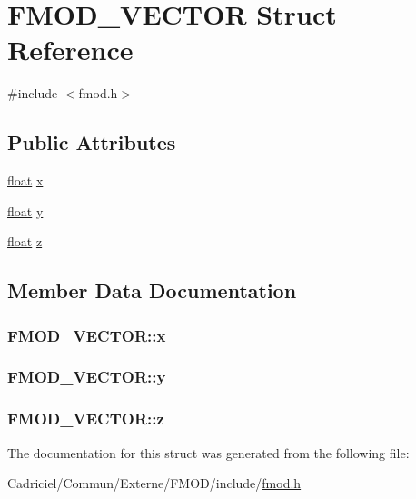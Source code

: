\hypertarget{struct_f_m_o_d___v_e_c_t_o_r}{\section{F\-M\-O\-D\-\_\-\-V\-E\-C\-T\-O\-R Struct Reference}
\label{struct_f_m_o_d___v_e_c_t_o_r}
}


{\ttfamily \#include $<$fmod.\-h$>$}

\subsection*{Public Attributes}
\begin{DoxyCompactItemize}
\item 
\hyperlink{fmod_8h_aeb841aa4b4b5f444b5d739d865b420af}{float} \hyperlink{struct_f_m_o_d___v_e_c_t_o_r_afe9fad8ce812c3cfc021c25bbb8bc0e8}{x}
\item 
\hyperlink{fmod_8h_aeb841aa4b4b5f444b5d739d865b420af}{float} \hyperlink{struct_f_m_o_d___v_e_c_t_o_r_abea7feb26ece298baa766f821b8686ff}{y}
\item 
\hyperlink{fmod_8h_aeb841aa4b4b5f444b5d739d865b420af}{float} \hyperlink{struct_f_m_o_d___v_e_c_t_o_r_ab64088b1bd2e695bd1abc6b370b71796}{z}
\end{DoxyCompactItemize}


\subsection{Member Data Documentation}
\hypertarget{struct_f_m_o_d___v_e_c_t_o_r_afe9fad8ce812c3cfc021c25bbb8bc0e8}{
\subsubsection[{x}]{ F\-M\-O\-D\-\_\-\-V\-E\-C\-T\-O\-R\-::x}}\label{struct_f_m_o_d___v_e_c_t_o_r_afe9fad8ce812c3cfc021c25bbb8bc0e8}
\hypertarget{struct_f_m_o_d___v_e_c_t_o_r_abea7feb26ece298baa766f821b8686ff}{
\subsubsection[{y}]{ F\-M\-O\-D\-\_\-\-V\-E\-C\-T\-O\-R\-::y}}\label{struct_f_m_o_d___v_e_c_t_o_r_abea7feb26ece298baa766f821b8686ff}
\hypertarget{struct_f_m_o_d___v_e_c_t_o_r_ab64088b1bd2e695bd1abc6b370b71796}{
\subsubsection[{z}]{ F\-M\-O\-D\-\_\-\-V\-E\-C\-T\-O\-R\-::z}}\label{struct_f_m_o_d___v_e_c_t_o_r_ab64088b1bd2e695bd1abc6b370b71796}


The documentation for this struct was generated from the following file\-:\begin{DoxyCompactItemize}
\item 
Cadriciel/\-Commun/\-Externe/\-F\-M\-O\-D/include/\hyperlink{fmod_8h}{fmod.\-h}\end{DoxyCompactItemize}
